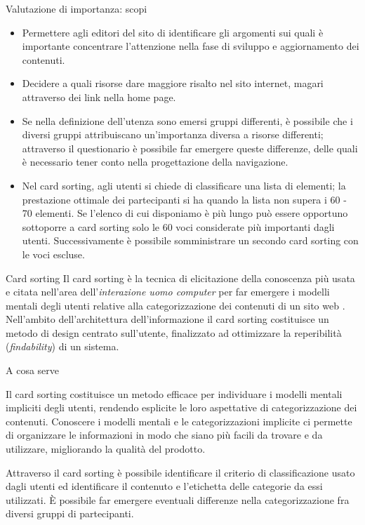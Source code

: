 \documentclass[pdf,mpa]{prosper}
\begin{document}
\begin{slide}{Valutazione di importanza: scopi}
\begin{itemize}
\item Permettere agli editori del sito di identificare gli argomenti sui quali è importante concentrare l'attenzione nella fase di sviluppo e aggiornamento dei contenuti.
\item Decidere a quali risorse dare maggiore risalto nel sito internet, magari attraverso dei link nella home page.
\item Se nella definizione dell'utenza sono emersi gruppi differenti, è possibile che i diversi gruppi attribuiscano un'importanza diversa a risorse differenti; attraverso il questionario è possibile far emergere queste differenze, delle quali è necessario tener conto nella progettazione della navigazione.
\item Nel card sorting, agli utenti si chiede di classificare una lista di elementi; la prestazione ottimale dei partecipanti si ha quando la lista non supera i 60 - 70 elementi. Se l'elenco di cui disponiamo è più lungo può essere opportuno sottoporre a card sorting solo le 60 voci considerate più importanti dagli utenti. Successivamente è possibile somministrare un secondo card sorting con le voci escluse.
\end{itemize}

\end{slide}

\begin{slide}{Card sorting}
Il card sorting \`e la tecnica di elicitazione della conoscenza pi\`u usata e citata nell'area dell'\textit{interazione uomo computer} per far emergere i modelli mentali degli utenti relative alla categorizzazione dei contenuti di un sito web \citep{Nielsen1994,RuggMcGeorge1997,Maurer2004,Nielsen20040719,Fincher2005}.\\ %
Nell'ambito dell'architettura dell'informazione il card sorting costituisce un metodo di design centrato sull'utente, finalizzato ad ottimizzare la reperibilit\`a (\textit{findability}) di un sistema. 
\end{slide}

\begin{slide}{A cosa serve}

Il card sorting costituisce un metodo efficace per individuare i modelli mentali impliciti degli utenti, rendendo esplicite le loro aspettative di categorizzazione dei contenuti. Conoscere i modelli mentali e le categorizzazioni implicite ci permette di organizzare le informazioni in modo che siano pi\`u facili da trovare e da utilizzare, migliorando la qualit\`a del prodotto.

Attraverso il card sorting è possibile identificare il criterio di classificazione usato dagli utenti ed identificare il contenuto e l'etichetta delle categorie da essi utilizzati. È possibile far emergere eventuali differenze nella categorizzazione fra diversi gruppi di partecipanti.
\end{slide}
\end{document}

